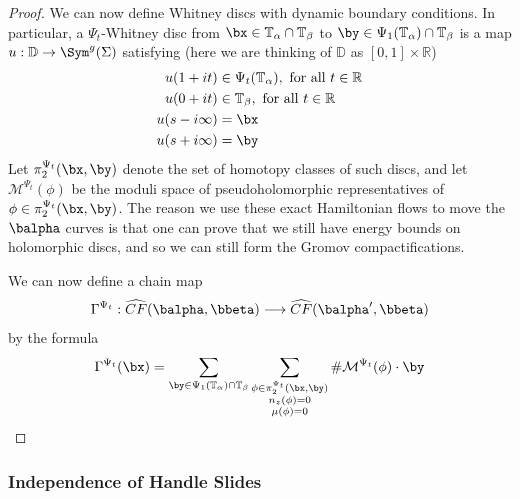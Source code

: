 \begin{proof}
We can now define Whitney discs with dynamic boundary conditions. In particular, a $\Psi_t$-Whitney disc from $\bx \in \mathbb T_\alpha \cap \mathbb T_\beta$ to $\by \in \Psi_1(\mathbb T_\alpha) \cap \mathbb T_\beta$ is a map $u : \mathbb D \rightarrow \Sym^g(\Sigma)$ satisfying (here we are thinking of $\mathbb D$ as $[0,1] \times \mathbb R$)
\begin{align*}
	u(1+it) &\in \Psi_t(\mathbb T_\alpha), \text{ for all } t \in \mathbb R \\
	u(0+it) &\in \mathbb T_\beta, \text{ for all } t \in \mathbb R \\
	u(s-i\infty) &= \bx \\
	u(s+i\infty) &= \by 
\end{align*}
Let $\pi_2^{\Psi_t}(\bx,\by)$ denote the set of homotopy classes of such discs, and let $\mathcal M^{\Psi_t}(\phi)$ be the moduli space of pseudoholomorphic representatives of $\phi \in \pi_2^{\Psi_t}(\bx,\by)$. The reason we use these exact Hamiltonian flows to move the $\balpha$ curves is that one can prove that we still have energy bounds on holomorphic discs, and so we can still form the Gromov compactifications. 

We can now define a chain map
\[ \Gamma^{\Psi_t} : \widehat{CF}(\balpha,\bbeta) \longrightarrow \widehat{CF}(\balpha',\bbeta) \]
by the formula
\[ \Gamma^{\Psi_t}(\bx) = \sum_{\by \in \Psi_1(\mathbb T_\alpha) \cap \mathbb T_\beta} \sum_{\substack{\phi \in \pi_2^{\Psi_t}(\bx,\by) \\ n_z(\phi)=0 \\ \mu(\phi) = 0}} \# \mathcal M^{\Psi_t}(\phi) \cdot \by \]





\unfinished
\end{proof}




\subsubsection{Independence of Handle Slides}

